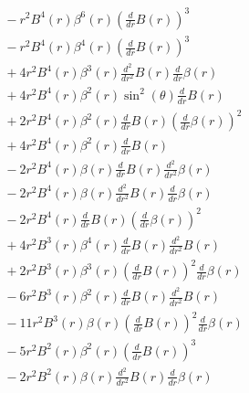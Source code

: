 \documentclass[11pt,a4paper]{article}
\begin{document}
\begin{align*}
  &\quad - r^{2} B^{4}{\left(r \right)} \beta^{6}{\left(r \right)} \left(\frac{d}{d r} B{\left(r \right)}\right)^{3} \\
  &\quad - r^{2} B^{4}{\left(r \right)} \beta^{4}{\left(r \right)} \left(\frac{d}{d r} B{\left(r \right)}\right)^{3} \\
  &\quad + 4 r^{2} B^{4}{\left(r \right)} \beta^{3}{\left(r \right)} \frac{d^{2}}{d r^{2}} B{\left(r \right)} \frac{d}{d r} \beta{\left(r \right)} \\
  &\quad + 4 r^{2} B^{4}{\left(r \right)} \beta^{2}{\left(r \right)} \sin^{2}{\left(\theta \right)} \frac{d}{d r} B{\left(r \right)} \\
  &\quad + 2 r^{2} B^{4}{\left(r \right)} \beta^{2}{\left(r \right)} \frac{d}{d r} B{\left(r \right)} \left(\frac{d}{d r} \beta{\left(r \right)}\right)^{2} \\
  &\quad + 4 r^{2} B^{4}{\left(r \right)} \beta^{2}{\left(r \right)} \frac{d}{d r} B{\left(r \right)} \\
  &\quad - 2 r^{2} B^{4}{\left(r \right)} \beta{\left(r \right)} \frac{d}{d r} B{\left(r \right)} \frac{d^{2}}{d r^{2}} \beta{\left(r \right)} \\
  &\quad - 2 r^{2} B^{4}{\left(r \right)} \beta{\left(r \right)} \frac{d^{2}}{d r^{2}} B{\left(r \right)} \frac{d}{d r} \beta{\left(r \right)} \\
  &\quad - 2 r^{2} B^{4}{\left(r \right)} \frac{d}{d r} B{\left(r \right)} \left(\frac{d}{d r} \beta{\left(r \right)}\right)^{2} \\
  &\quad + 4 r^{2} B^{3}{\left(r \right)} \beta^{4}{\left(r \right)} \frac{d}{d r} B{\left(r \right)} \frac{d^{2}}{d r^{2}} B{\left(r \right)} \\
  &\quad + 2 r^{2} B^{3}{\left(r \right)} \beta^{3}{\left(r \right)} \left(\frac{d}{d r} B{\left(r \right)}\right)^{2} \frac{d}{d r} \beta{\left(r \right)} \\
  &\quad - 6 r^{2} B^{3}{\left(r \right)} \beta^{2}{\left(r \right)} \frac{d}{d r} B{\left(r \right)} \frac{d^{2}}{d r^{2}} B{\left(r \right)} \\
  &\quad - 11 r^{2} B^{3}{\left(r \right)} \beta{\left(r \right)} \left(\frac{d}{d r} B{\left(r \right)}\right)^{2} \frac{d}{d r} \beta{\left(r \right)} \\
  &\quad - 5 r^{2} B^{2}{\left(r \right)} \beta^{2}{\left(r \right)} \left(\frac{d}{d r} B{\left(r \right)}\right)^{3} \\
  &\quad - 2 r^{2} B^{2}{\left(r \right)} \beta{\left(r \right)} \frac{d^{2}}{d r^{2}} B{\left(r \right)} \frac{d}{d r} \beta{\left(r \right)} \\

\end{align*}
\end{document}
